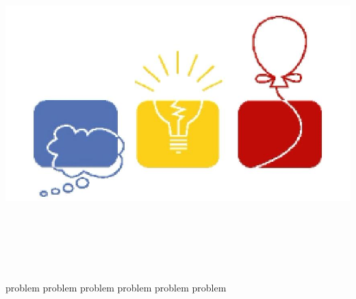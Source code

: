 \documentclass[12pt,a4paper,oneside]{article}
\begin{document}
\includegraphics[width=\textwidth]{icpc.jpg}
\\
\\
\\
\\
\\
\\

\begin{center}
\LARGE{\textbf{}}
\end{center}

\mbox{}\newpage\mbox{}\newpage

{problem}
{problem}
{problem}
{problem}
{problem}
{problem}
\end{document}
